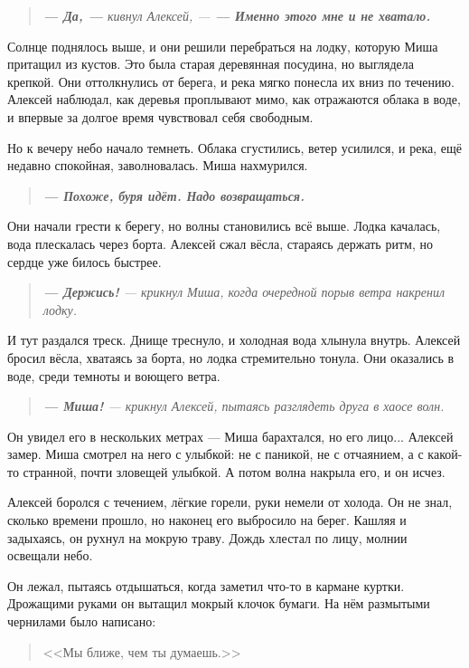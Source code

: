 \documentclass[12pt,a4paper]{book}
\newenvironment{dialogue}{\begin{quote}\itshape}{\end{quote}} %
\begin{document}
\begin{dialogue}
\textbf{--- Да, ---} кивнул Алексей, --- \textbf{--- Именно этого мне и не хватало.}
\end{dialogue}

Солнце поднялось выше, и они решили перебраться на лодку, которую Миша притащил из кустов. Это была старая деревянная посудина, но выглядела крепкой. Они оттолкнулись от берега, и река мягко понесла их вниз по течению. Алексей наблюдал, как деревья проплывают мимо, как отражаются облака в воде, и впервые за долгое время чувствовал себя свободным.

Но к вечеру небо начало темнеть. Облака сгустились, ветер усилился, и река, ещё недавно спокойная, заволновалась. Миша нахмурился.

\begin{dialogue}
\textbf{--- Похоже, буря идёт. Надо возвращаться.}
\end{dialogue}

Они начали грести к берегу, но волны становились всё выше. Лодка качалась, вода плескалась через борта. Алексей сжал вёсла, стараясь держать ритм, но сердце уже билось быстрее.

\begin{dialogue}
\textbf{--- Держись!} --- крикнул Миша, когда очередной порыв ветра накренил лодку.
\end{dialogue}

И тут раздался треск. Днище треснуло, и холодная вода хлынула внутрь. Алексей бросил вёсла, хватаясь за борта, но лодка стремительно тонула. Они оказались в воде, среди темноты и воющего ветра.

\begin{dialogue}
\textbf{--- Миша!} --- крикнул Алексей, пытаясь разглядеть друга в хаосе волн.
\end{dialogue}

Он увидел его в нескольких метрах --- Миша барахтался, но его лицо... Алексей замер. Миша смотрел на него с улыбкой: не с паникой, не с отчаянием, а с какой-то странной, почти зловещей улыбкой. А потом волна накрыла его, и он исчез.

Алексей боролся с течением, лёгкие горели, руки немели от холода. Он не знал, сколько времени прошло, но наконец его выбросило на берег. Кашляя и задыхаясь, он рухнул на мокрую траву. Дождь хлестал по лицу, молнии освещали небо.

Он лежал, пытаясь отдышаться, когда заметил что-то в кармане куртки. Дрожащими руками он вытащил мокрый клочок бумаги. На нём размытыми чернилами было написано:
\begin{quote}
<<Мы ближе, чем ты думаешь.>>
\end{quote}
\end{document}
